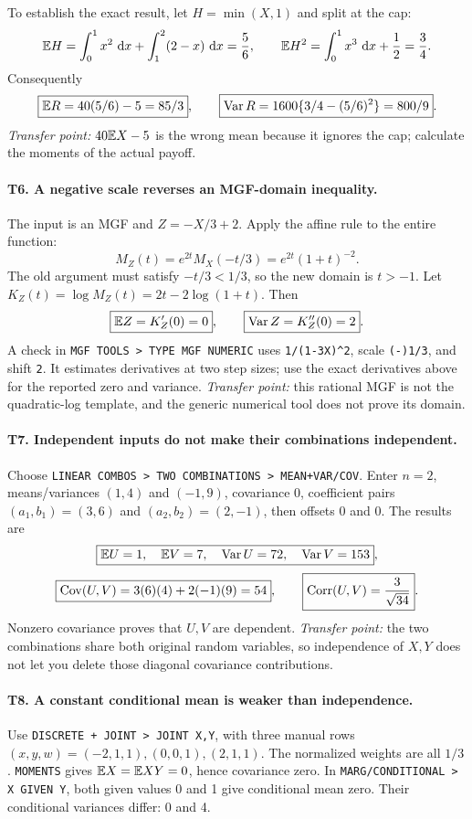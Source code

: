 To establish the exact result, let $H=\min(X,1)$ and split at the cap:
\[
\mathbb E H=\int_0^1x^2\,\,\mathrm d x+\int_1^2(2-x)\,\,\mathrm d x=\frac56,
\qquad
\mathbb E H^2=\int_0^1x^3\,\,\mathrm d x+\frac12=\frac34.
\]
Consequently
\[
\boxed{\mathbb E R=40(5/6)-5=85/3},\qquad
\boxed{\operatorname{Var} R=1600\{3/4-(5/6)^2\}=800/9}.
\]
\emph{Transfer point:} $40\mathbb E X-5$ is the wrong mean because it ignores the cap; calculate the moments of the actual payoff.

\paragraph{T6. A negative scale reverses an MGF-domain inequality.}
The input is an MGF and $Z=-X/3+2$. Apply the affine rule to the entire function:
\[
M_Z(t)=e^{2t}M_X(-t/3)=\boxed{e^{2t}(1+t)^{-2}}.
\]
The old argument must satisfy $-t/3<1/3$, so the new domain is $\boxed{t>-1}$. Let $K_Z(t)=\log M_Z(t)=2t-2\log(1+t)$. Then
\[
\boxed{\mathbb E Z=K_Z'(0)=0},\qquad
\boxed{\operatorname{Var} Z=K_Z''(0)=2}.
\]
A check in \texttt{MGF TOOLS > TYPE MGF NUMERIC} uses \texttt{1/(1-3X)\^{}2}, scale \texttt{(-)1/3}, and shift \texttt{2}. It estimates derivatives at two step sizes; use the exact derivatives above for the reported zero and variance. \emph{Transfer point:} this rational MGF is not the quadratic-log template, and the generic numerical tool does not prove its domain.

\paragraph{T7. Independent inputs do not make their combinations independent.}
Choose \texttt{LINEAR COMBOS > TWO COMBINATIONS > MEAN+VAR/COV}. Enter $n=2$, means/variances $(1,4)$ and $(-1,9)$, covariance 0, coefficient pairs $(a_1,b_1)=(3,6)$ and $(a_2,b_2)=(2,-1)$, then offsets 0 and 0. The results are
\[
\boxed{\mathbb E U=1,\quad\mathbb E V=7,\quad\operatorname{Var} U=72,\quad\operatorname{Var} V=153},
\]
\[
\boxed{\operatorname{Cov}(U,V)=3(6)(4)+2(-1)(9)=54},\qquad
\boxed{\operatorname{Corr}(U,V)=\frac3{\sqrt{34}}}.
\]
Nonzero covariance proves that $U,V$ are dependent. \emph{Transfer point:} the two combinations share both original random variables, so independence of $X,Y$ does not let you delete those diagonal covariance contributions.

\paragraph{T8. A constant conditional mean is weaker than independence.}
Use \texttt{DISCRETE + JOINT > JOINT X,Y}, with three manual rows $(x,y,w)=(-2,1,1),(0,0,1),(2,1,1)$. The normalized weights are all $1/3$. \texttt{MOMENTS} gives $\mathbb E X=\mathbb E XY=0$, hence covariance zero. In \texttt{MARG/CONDITIONAL > X GIVEN Y}, both given values 0 and 1 give conditional mean zero. Their conditional variances differ: 0 and 4.

